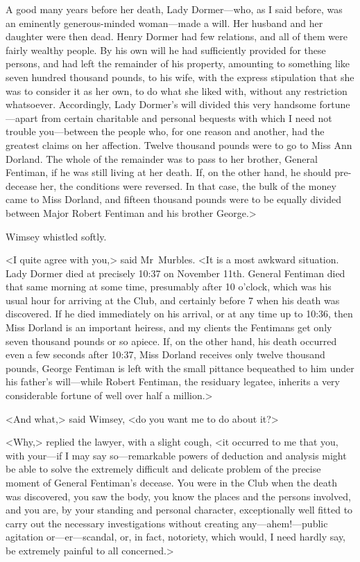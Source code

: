 A good many years before her death, Lady Dormer—who, as I said before, was an eminently generous-minded woman—made a will. Her husband and her daughter were then dead. Henry Dormer had few relations, and all of them were fairly wealthy people. By his own will he had sufficiently provided for these persons, and had left the remainder of his property, amounting to something like seven hundred thousand pounds, to his wife, with the express stipulation that she was to consider it as her own, to do what she liked with, without any restriction whatsoever. Accordingly, Lady Dormer's will divided this very handsome fortune—apart from certain charitable and personal bequests with which I need not trouble you—between the people who, for one reason and another, had the greatest claims on her affection. Twelve thousand pounds were to go to Miss Ann Dorland. The whole of the remainder was to pass to her brother, General Fentiman, if he was still living at her death. If, on the other hand, he should pre-decease her, the conditions were reversed. In that case, the bulk of the money came to Miss Dorland, and fifteen thousand pounds were to be equally divided between Major Robert Fentiman and his brother George.>

Wimsey whistled softly.

<I quite agree with you,> said Mr~Murbles. <It is a most awkward situation. Lady Dormer died at precisely 10:37  on November  11th. General Fentiman died that same morning at some time, presumably after 10 o'clock, which was his usual hour for arriving at the Club, and certainly before 7  when his death was discovered. If he died immediately on his arrival, or at any time up to 10:36, then Miss Dorland is an important heiress, and my clients the Fentimans get only seven thousand pounds or so apiece. If, on the other hand, his death occurred even a few seconds after 10:37, Miss Dorland receives only twelve thousand pounds, George Fentiman is left with the small pittance bequeathed to him under his father's will—while Robert Fentiman, the residuary legatee, inherits a very considerable fortune of well over half a million.>

<And what,> said Wimsey, <do you want me to do about it?>

<Why,> replied the lawyer, with a slight cough, <it occurred to me that you, with your—if I may say so—remarkable powers of deduction and analysis might be able to solve the extremely difficult and delicate problem of the precise moment of General Fentiman's decease. You were in the Club when the death was discovered, you saw the body, you know the places and the persons involved, and you are, by your standing and personal character, exceptionally well fitted to carry out the necessary investigations without creating any—ahem!—public agitation or—er—scandal, or, in fact, notoriety, which would, I need hardly say, be extremely painful to all concerned.>

